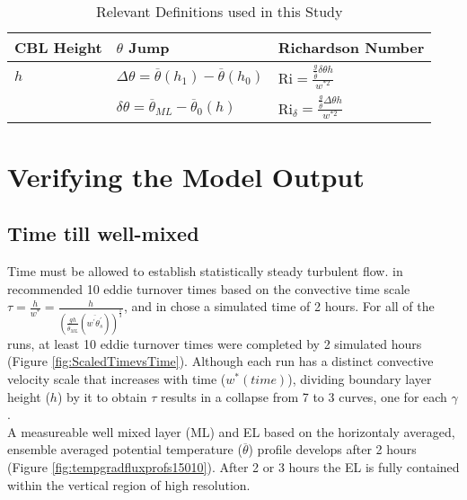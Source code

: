 \begin{table}[htbp]
    \begin{tabular}{p{4cm}p{4cm}p{4cm}}
    \hline
      CBL Height & $\theta$ Jump & Richardson Number   \\ \hline 
      $h$ & $\Delta \theta = \overline{\theta}(h_{1}) - \overline{\theta}(h_{0})$ & \acs{Ri}$=\frac{\frac{g}{\overline{\theta}} \delta \theta h}{w^{*2}}$\\
          & $\delta \theta = \overline{\theta}_{ML}-\overline{\theta}_{0}(h)$ & \acs{Ri}$_{\delta}=\frac{\frac{g}{\overline{\theta}} \Delta \theta h}{w^{*2}}$\\ \hline      
    \end{tabular}
\caption{Relevant Definitions used in this Study}
\label{table:reldefs}   
\end{table}

\clearpage

\section{Verifying the Model Output}
\label{sec:CheckingtheModel}
\subsection{Time till well-mixed}%
\FloatBarrier

Time must be allowed to establish statistically steady turbulent flow.  \citeauthor{SullMoengStev} in 
\cite{SullMoengStev} recommended 10 eddie turnover times based on the convective time scale 
$\tau = \frac{h}{w^{*}} = \frac{h}{ \left( \frac{gh}{\overline{\theta}_{ML}}(\overline{w^{'} \theta^{'}_{s}}) \right)^{\frac{1}{3}} } $, 
and \citeauthor{BrooksFowler2} in \cite{BrooksFowler2} chose a simulated time of 2 hours.  For all of 
the runs, at least 10 eddie turnover times were completed by 2 simulated hours (Figure \ref{fig:ScaledTimevsTime}).  
Although each run has a distinct convective velocity scale that increases with time ($w^{*}(time)$), 
dividing boundary layer height ($h$) by it to obtain $\tau$ results in a collapse from 7 to 3 curves, 
one for each $\gamma$.\\

A measureable well mixed layer (\acs{ML}) and \acs{EL} based on the horizontaly averaged, ensemble averaged
potential temperature ($\overline{\theta}$) profile develops after 2 hours 
(Figure \ref{fig:tempgradfluxprofs15010}).  After 2 or 3 hours the \acs{EL} is fully contained within the vertical 
region of high resolution.\\

